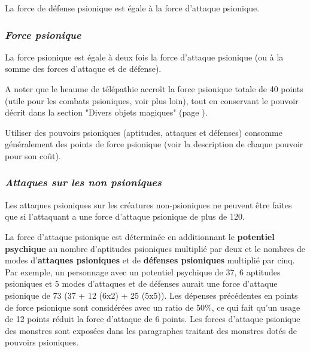\documentclass[11pt]{article}
\begin{document}
{\bigskip

La force de défense psionique est égale à la force d'attaque psionique.

\bigskip

\subsubsection*{\textit{Force psionique}}

La force psionique est égale à deux fois la force d'attaque psionique (ou à la somme des forces d'attaque et de défense).

\bigskip

A noter que le heaume de télépathie accroît la force psionique totale de 40 points (utile pour les combats psioniques, voir plus loin), tout en conservant le pouvoir décrit dans la section "Divers objets magiques" (page \pageref{heaume-telepathie}).

\bigskip

Utiliser des pouvoirs psioniques (aptitudes, attaques et défenses) consomme généralement des points de force psionique (voir la description de chaque pouvoir pour son coût).

\subsubsection*{\textit{Attaques sur les non psioniques}}







Les attaques psioniques sur les créatures non-psioniques ne peuvent être faites que si l'attaquant a une force d'attaque psionique de plus de 120.



La force d'attaque psionique est déterminée en additionnant le \textbf{potentiel psychique} au nombre d'aptitudes psioniques multiplié par deux et le nombres de modes d'\textbf{attaques psioniques} et de \textbf{défenses psioniques} multiplié par cinq. Par exemple, un personnage avec un potentiel psychique de 37, 6 aptitudes psioniques et 5 modes d'attaques et de défenses aurait une force d'attaque psionique de 73 (37 + 12 (6x2) + 25 (5x5)). Les dépenses précédentes en points de force psionique sont considérées avec un ratio de 50\%, ce qui fait qu'un usage de 12 points réduit la force d'attaque de 6 points. Les forces d'attaque psionique des monstres sont exposées dans les paragraphes traitant des monstres dotés de pouvoirs psioniques.

}
\end{document}

